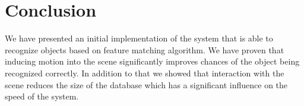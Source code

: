\section{Conclusion}
We have presented an initial implementation of the system that is able to recognize objects based on feature matching algorithm. We have proven that inducing motion into the scene significantly improves chances of the object being recognized correctly. In addition to that we showed that interaction with the scene reduces the size of the database which has a significant influence on the speed of the system.  
